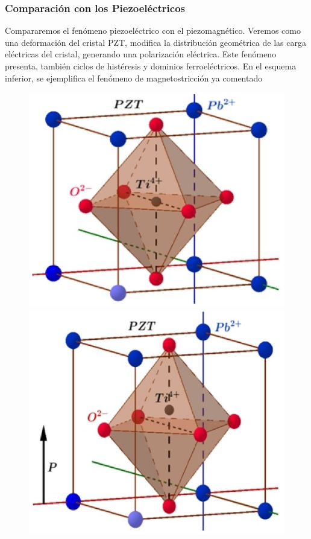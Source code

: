 \subsubsection{Comparación con los Piezoeléctricos}

Compararemos el fenómeno piezoeléctrico con el piezomagnético. Veremos como una deformación del cristal PZT, modifica la distribución geométrica de las carga eléctricas del cristal, generando una polarización eléctrica. Este fenómeno presenta, también ciclos de histéresis y dominios ferroeléctricos. En el esquema inferior, se ejemplifica el fenómeno de magnetostricción ya comentado

\begin{figure}[H]
  \centering
  \begin{minipage}[b]{0.47\textwidth}
    \centering
     \includegraphics[width=1.0\textwidth]{./Figures/piezo1}
  \end{minipage}
  \begin{minipage}[b]{0.47\textwidth}
    \centering
     \includegraphics[width=1.0\textwidth]{./Figures/piezo2}

\end{minipage}
\end{figure}
